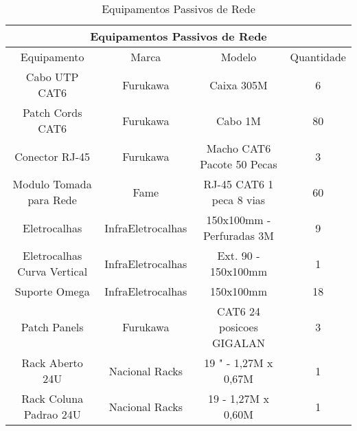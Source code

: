 \begin{table}[h!]
	\centering
	\caption{Equipamentos Passivos de Rede}
	\label{tab3} %
\begin{tabular}{|c|c|c|c|}
	\hline
\multicolumn{4}{|c|}{Equipamentos Passivos de Rede}                                                                                                                              \\ \hline
\multicolumn{1}{|c|}{Equipamento}                 & \multicolumn{1}{c|}{Marca}             & \multicolumn{1}{c|}{Modelo}                     & \multicolumn{1}{c|}{Quantidade} \\ \hline
\multicolumn{1}{|c|}{Cabo UTP CAT6}               & \multicolumn{1}{c|}{Furukawa}          & \multicolumn{1}{c|}{Caixa 305M}                 & \multicolumn{1}{c|}{6}          \\ \hline
\multicolumn{1}{|c|}{Patch Cords CAT6}            & \multicolumn{1}{c|}{Furukawa}          & \multicolumn{1}{c|}{Cabo 1M}                    & \multicolumn{1}{c|}{80}         \\ \hline
\multicolumn{1}{|c|}{Conector RJ-45}              & \multicolumn{1}{c|}{Furukawa}          & \multicolumn{1}{c|}{Macho CAT6 Pacote 50 Pecas} & \multicolumn{1}{c|}{3}          \\ \hline
\multicolumn{1}{|c|}{Modulo Tomada para Rede}     & \multicolumn{1}{c|}{Fame}              & \multicolumn{1}{c|}{RJ-45 CAT6 1 peca 8 vias}   & \multicolumn{1}{c|}{60}         \\ \hline
\multicolumn{1}{|c|}{Eletrocalhas}                & \multicolumn{1}{c|}{InfraEletrocalhas} & \multicolumn{1}{c|}{150x100mm - Perfuradas  3M} & \multicolumn{1}{c|}{9}          \\ \hline
\multicolumn{1}{|c|}{Eletrocalhas Curva Vertical} & \multicolumn{1}{c|}{InfraEletrocalhas} & \multicolumn{1}{c|}{Ext. 90 - 150x100mm}        & \multicolumn{1}{c|}{1}          \\ \hline
\multicolumn{1}{|c|}{Suporte Omega}               & \multicolumn{1}{c|}{InfraEletrocalhas} & \multicolumn{1}{c|}{150x100mm}                  & \multicolumn{1}{c|}{18}         \\ \hline
\multicolumn{1}{|c|}{Patch Panels}                & \multicolumn{1}{c|}{Furukawa}          & \multicolumn{1}{c|}{CAT6 24 posicoes GIGALAN}   & \multicolumn{1}{c|}{3}          \\ \hline
\multicolumn{1}{|c|}{Rack Aberto 24U}             & \multicolumn{1}{c|}{Nacional Racks}    & \multicolumn{1}{c|}{19 " - 1,27M x 0,67M}        & \multicolumn{1}{c|}{1}          \\ \hline
\multicolumn{1}{|c|}{Rack Coluna Padrao 24U}      & \multicolumn{1}{c|}{Nacional Racks}    & \multicolumn{1}{c|}{19  - 1,27M x 0,60M}          & \multicolumn{1}{c|}{1}          \\ \hline
\end{tabular}
\end{table}















